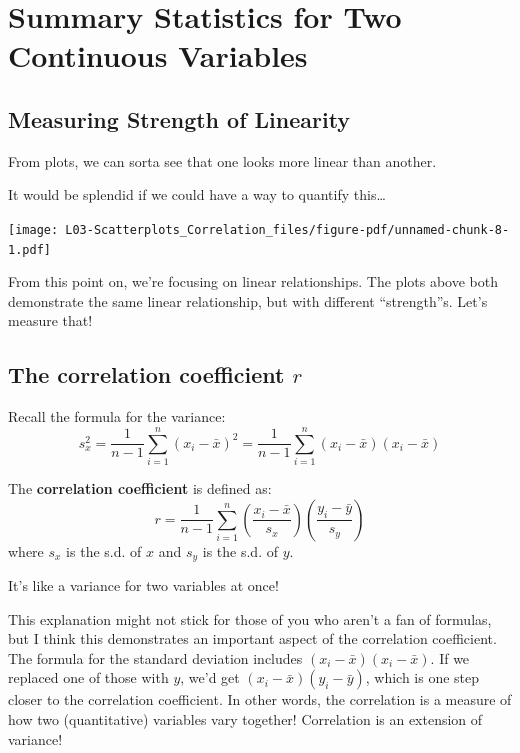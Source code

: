 \documentclass[
  letterpaper,
  DIV=11,
  numbers=noendperiod,
  oneside]{scrreprt}
\begin{document}
\hypertarget{summary-statistics-for-two-continuous-variables}{%
\section{Summary Statistics for Two Continuous
Variables}\label{summary-statistics-for-two-continuous-variables}}

\hypertarget{measuring-strength-of-linearity}{%
\subsection{Measuring Strength of
Linearity}\label{measuring-strength-of-linearity}}

\vspace{1cm}

From plots, we can sorta see that one looks more linear than another.

It would be splendid if we could have a way to quantify this\ldots{}

\texttt{[image: L03-Scatterplots\_Correlation\_files/figure-pdf/unnamed-chunk-8-1.pdf]}

From this point on, we're focusing on linear relationships. The plots
above both demonstrate the same linear relationship, but with different
``strength''s. Let's measure that!

\hypertarget{the-correlation-coefficient-r}{%
\subsection{\texorpdfstring{The correlation coefficient
\(r\)}{The correlation coefficient r}}\label{the-correlation-coefficient-r}}

Recall the formula for the variance: \[
s_x^2 = \frac{1}{n-1}\sum_{i=1}^n(x_i - \bar x)^2 = \frac{1}{n-1}\sum_{i=1}^n(x_i - \bar x)(x_i - \bar x) 
\]

The \textbf{correlation coefficient} is defined as: \[
r = \frac{1}{n-1}\sum_{i=1}^n\left(\frac{x_i - \bar x}{s_x}\right)\left(\frac{y_i - \bar y}{s_y}\right)
\] where \(s_x\) is the s.d. of \(x\) and \(s_y\) is the s.d. of \(y\).

It's like a variance for two variables at once!

This explanation might not stick for those of you who aren't a fan of
formulas, but I think this demonstrates an important aspect of the
correlation coefficient. The formula for the standard deviation includes
\((x_i - \bar x)(x_i - \bar x)\). If we replaced one of those with
\(y\), we'd get \((x_i - \bar x)(y_i - \bar y)\), which is one step
closer to the correlation coefficient. In other words, the correlation
is a measure of how two (quantitative) variables vary together!
Correlation is an extension of variance!
\end{document}
